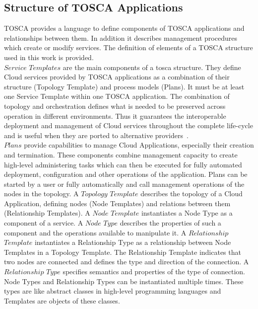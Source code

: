 \subsection*{Structure of TOSCA Applications}
TOSCA provides a language to define components of TOSCA applications and relationships between them. %
In addition it describes  management procedures which create or modify services. %
The definition of elements of a TOSCA structure used in this work is provided. \\
$Service$ $Templates$ are the main components of a \gls{tosca} structure. 
They define Cloud services provided by TOSCA applications as a combination of their structure (Topology Template) and process models (Plans).
It must be at least one Service Template within one TOSCA application.
The combination of topology and orchestration defines what is needed to be preserved across operation in different environments.
Thus it guarantees the interoperable deployment and management of Cloud services throughout the complete life-cycle and is useful when they are ported to alternative providers~\cite{TOSCA-v1.0_book}. \\ %
$Plans$ provide capabilities to manage Cloud Applications, especially their creation and termination.
These components combine management capacity to create high-level administering tasks which can then be executed for fully automated deployment, configuration and other operations of the application.
Plans can be started by a user or fully automatically and call management operations of the nodes in the topology. %
A $Topology$ $Template$ describes the topology of a Cloud Application, defining nodes (Node Templates) and relations between them (Relationship Templates). %
A $Node$ $Template$ instantiates a Node Type as a component of a service. 
A $Node$ $Type$ describes the properties of such a component and the operations available to manipulate it.
A $Relationship$ $Template$ instantiates a Relationship Type as a relationship between Node Templates in a Topology Template. 
The Relationship Template indicates that two nodes are connected and defines the type and direction of the connection.
A $Relationship$ $Type$ specifies semantics and properties of the type of connection.\label{subs:reltype} %
Node Types and Relationship Types can be instantiated multiple times.
These types are like abstract classes in high-level programming languages and Templates are objects of these classes.\\
